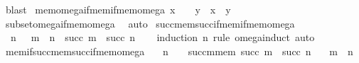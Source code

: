 \begin{isabellebody}
\ blast%
\endisatagproof
{\isafoldproof}%
%
\isadelimproof
\isanewline
%
\endisadelimproof
\isanewline
{}\isamarkupfalse%
\ mem{\isacharunderscore}{\kern0pt}omega{\isacharunderscore}{\kern0pt}if{\isacharunderscore}{\kern0pt}mem{\isacharunderscore}{\kern0pt}if{\isacharunderscore}{\kern0pt}mem{\isacharunderscore}{\kern0pt}omega{\isacharcolon}{\kern0pt}\ {\isachardoublequoteopen}x\ {\isasymin}\ {\isasymomega}\ {\isasymLongrightarrow}\ y\ {\isasymin}\ x\ {\isasymLongrightarrow}\ y\ {\isasymin}\ {\isasymomega}{\isachardoublequoteclose}\isanewline
%
\isadelimproof
\ \ %
\endisadelimproof
%
\isatagproof
{}\isamarkupfalse%
\ subset{\isacharunderscore}{\kern0pt}omega{\isacharunderscore}{\kern0pt}if{\isacharunderscore}{\kern0pt}mem{\isacharunderscore}{\kern0pt}omega\ \isamarkupfalse%
\ auto%
\endisatagproof
{\isafoldproof}%
%
\isadelimproof
\isanewline
%
\endisadelimproof
\isanewline
{}\isamarkupfalse%
\ succ{\isacharunderscore}{\kern0pt}mem{\isacharunderscore}{\kern0pt}succ{\isacharunderscore}{\kern0pt}if{\isacharunderscore}{\kern0pt}mem{\isacharunderscore}{\kern0pt}if{\isacharunderscore}{\kern0pt}mem{\isacharunderscore}{\kern0pt}omega{\isacharcolon}{\kern0pt}\isanewline
\ \ {\isachardoublequoteopen}{\isasymlbrakk}n\ {\isasymin}\ {\isasymomega}{\isacharsemicolon}{\kern0pt}\ m\ {\isasymin}\ n{\isasymrbrakk}\ {\isasymLongrightarrow}\ succ\ m\ {\isasymin}\ succ\ n{\isachardoublequoteclose}\isanewline
%
\isadelimproof
\ \ %
\endisadelimproof
%
\isatagproof
{}\isamarkupfalse%
\ {\isacharparenleft}{\kern0pt}induction\ n\ rule{\isacharcolon}{\kern0pt}\ omega{\isacharunderscore}{\kern0pt}induct{\isacharparenright}{\kern0pt}\ auto%
\endisatagproof
{\isafoldproof}%
%
\isadelimproof
\isanewline
%
\endisadelimproof
\isanewline
{}\isamarkupfalse%
\ mem{\isacharunderscore}{\kern0pt}if{\isacharunderscore}{\kern0pt}succ{\isacharunderscore}{\kern0pt}mem{\isacharunderscore}{\kern0pt}succ{\isacharunderscore}{\kern0pt}if{\isacharunderscore}{\kern0pt}mem{\isacharunderscore}{\kern0pt}omega{\isacharcolon}{\kern0pt}\isanewline
\ \ \ {\isachardoublequoteopen}n\ {\isasymin}\ {\isasymomega}{\isachardoublequoteclose}\ \ succ{\isacharunderscore}{\kern0pt}m{\isacharunderscore}{\kern0pt}mem{\isacharcolon}{\kern0pt}\ {\isachardoublequoteopen}succ\ m\ {\isasymin}\ succ\ n{\isachardoublequoteclose}\isanewline
\ \ \ {\isachardoublequoteopen}m\ {\isasymin}\ n{\isachardoublequoteclose}\isanewline
%
\isadelimproof
%
\endisadelimproof
%
\isatagproof
{}\isamarkupfalse%

\end{isabellebody}
